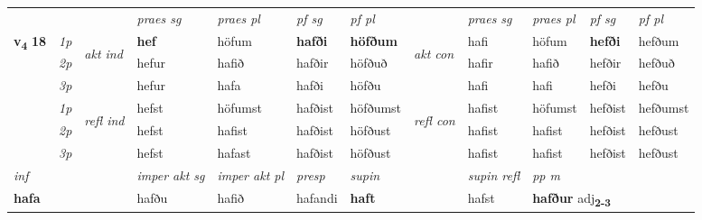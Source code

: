 \begin{longtable}[l]{X>{\footnotesize\itshape}llXXXXlXXXX}
 & &   & \textit{praes sg}  & \textit{praes pl}    & \textit{ pf sg} & \textit{pf pl} & & \textit{praes sg}  & \textit{praes pl}    & \textit{pf sg} & \textit{pf pl }  \\ \cmidrule{4-7} \cmidrule{9-12}
 \multirow{2}{*}{{{\textbf{v{\textsubscript{4}}} \Large{\textbf{18}}}}}  & 1p & \multirow{3}{*}{\begin{turn}{90}\textit{akt ind}\end{turn}} & \textbf{hef} & höfum & \textbf{hafði} & \textbf{höfðum} & \multirow{3}{*}{\begin{turn}{90}\textit{akt con}\end{turn}} &hafi & höfum & \textbf{hefði} & hefðum\\*
 & 2p &  &  hefur  & hafið & hafðir & höfðuð & & hafir & hafið & hefðir & hefðuð \\*
 & 3p &  & hefur & hafa & hafði & höfðu & & hafi & hafi& hefði & hefðu \\*
\cmidrule{4-7} \cmidrule{9-12}
 & 1p & \multirow{3}{*}{\begin{turn}{90}\textit{refl ind}\end{turn}}  & hefst & höfumst & hafðist & höfðumst & \multirow{3}{*}{\begin{turn}{90}\textit{refl con}\end{turn}}  &hafist & höfumst & hefðist & hefðumst \\*
 & 2p &  & hefst & hafist & hafðist & höfðust & &hafist & hafist & hefðist & hefðust \\*
 & 3p  & & hefst & hafast & hafðist & höfðust & & hafist & hafist& hefðist & hefðust \\*
\cmidrule{4-7} \cmidrule{9-12}

   {\textit{inf}} & &  & \textit{imper akt sg} & \textit{imper akt pl}   & \textit{presp} & \textit{supin} && \textit{supin refl} & \textit{pp m} \\*
  {\textbf{hafa}} & && hafðu  & hafið   & hafandi &  \textbf{haft} && hafst & \multicolumn{2}{l}{\textbf{hafður} adj\textbf{\textsubscript{2-3}}} \\*

\midrule


\end{longtable}
